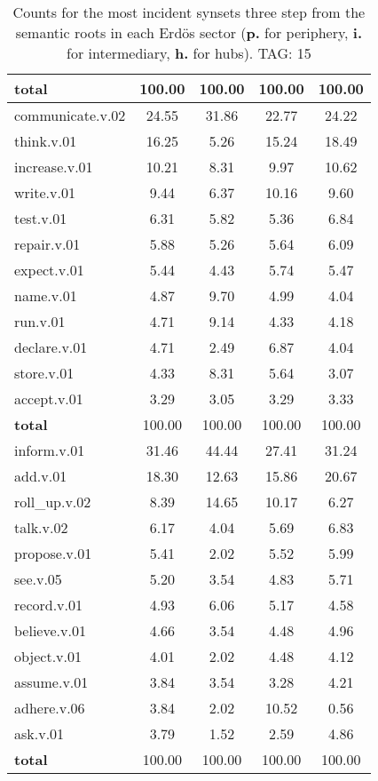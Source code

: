 \begin{table}[h!]
\begin{center}
\begin{tabular}{| l || c | c | c | c |}
{{\bf total}} & 100.00  & 100.00  & 100.00  & 100.00 \\\hline\hline\hline
communicate.v.02 & 24.55  & 31.86  & 22.77  & 24.22 \\\hline
think.v.01 & 16.25  & 5.26  & 15.24  & 18.49 \\\hline
increase.v.01 & 10.21  & 8.31  & 9.97  & 10.62 \\\hline
write.v.01 & 9.44  & 6.37  & 10.16  & 9.60 \\\hline
test.v.01 & 6.31  & 5.82  & 5.36  & 6.84 \\\hline
repair.v.01 & 5.88  & 5.26  & 5.64  & 6.09 \\\hline
expect.v.01 & 5.44  & 4.43  & 5.74  & 5.47 \\\hline
name.v.01 & 4.87  & 9.70  & 4.99  & 4.04 \\\hline
run.v.01 & 4.71  & 9.14  & 4.33  & 4.18 \\\hline
declare.v.01 & 4.71  & 2.49  & 6.87  & 4.04 \\\hline
store.v.01 & 4.33  & 8.31  & 5.64  & 3.07 \\\hline
accept.v.01 & 3.29  & 3.05  & 3.29  & 3.33 \\\hline\hline
{{\bf total}} & 100.00  & 100.00  & 100.00  & 100.00 \\\hline\hline\hline
inform.v.01 & 31.46  & 44.44  & 27.41  & 31.24 \\\hline
add.v.01 & 18.30  & 12.63  & 15.86  & 20.67 \\\hline
roll\_up.v.02 & 8.39  & 14.65  & 10.17  & 6.27 \\\hline
talk.v.02 & 6.17  & 4.04  & 5.69  & 6.83 \\\hline
propose.v.01 & 5.41  & 2.02  & 5.52  & 5.99 \\\hline
see.v.05 & 5.20  & 3.54  & 4.83  & 5.71 \\\hline
record.v.01 & 4.93  & 6.06  & 5.17  & 4.58 \\\hline
believe.v.01 & 4.66  & 3.54  & 4.48  & 4.96 \\\hline
object.v.01 & 4.01  & 2.02  & 4.48  & 4.12 \\\hline
assume.v.01 & 3.84  & 3.54  & 3.28  & 4.21 \\\hline
adhere.v.06 & 3.84  & 2.02  & 10.52  & 0.56 \\\hline
ask.v.01 & 3.79  & 1.52  & 2.59  & 4.86 \\\hline\hline
{{\bf total}} & 100.00  & 100.00  & 100.00  & 100.00 \\\hline
\end{tabular}
\caption{Counts for the most incident synsets three step from the semantic roots in each Erd\"os sector ({\bf p.} for periphery, {\bf i.} for intermediary, {\bf h.} for hubs). TAG: 15}
\end{center}
\end{table}